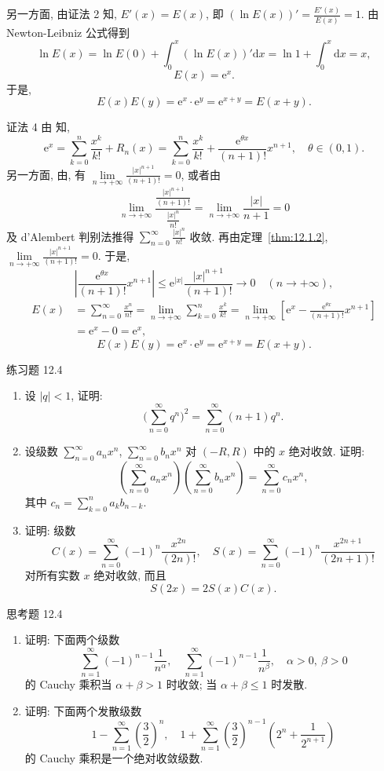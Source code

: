 另一方面, 由证法 2 知, $E'(x)=E(x)$, 即 $(\ln E(x))'=\frac{E'(x)}{E(x)}=1$. 由 Newton-Leibniz 公式得到
\[
  \ln E(x)=\ln E(0)+\int_{0}^{x}(\ln E(x))'\mathrm{d}x=\ln1+\int_{0}^{x}\mathrm{d}x=x,
\]
\[
  E(x)=\mathrm{e}^{x}.
\]
于是,
\[
  E(x)E(y)=\mathrm{e}^{x}\cdot\mathrm{e}^{y}=\mathrm{e}^{x+y}=E(x+y).
\]

证法 4 由 知,
\[
  \mathrm{e}^{x}=\sum_{k=0}^{n}\frac{x^{k}}{k!}+R_{n}(x)=\sum_{k=0}^{n}\frac{x^{k}}{k!}+\frac{\mathrm{e}^{\theta x}}{(n+1)!}x^{n+1},\quad\theta\in(0,1).
\]
另一方面, 由, 有 $\lim\limits_{n\to+\infty}\frac{|x|^{n+1}}{(n+1)!}=0$, 或者由
\[
  \lim_{n\to+\infty}\frac{\frac{|x|^{n+1}}{(n+1)!}}{\frac{|x|^{n}}{n!}}=\lim_{n\to+\infty}\frac{|x|}{n+1}=0
\]
及 d'Alembert 判别法推得 $\sum_{n=0}^{\infty}\frac{|x|^{n}}{n!}$ 收敛. 再由定理~\ref{thm:12.1.2}, $\lim\limits_{n\to+\infty}\frac{|x|^{n+1}}{(n+1)!}=0$. 于是,
\[
  \left|\frac{\mathrm{e}^{\theta x}}{(n+1)!}x^{n+1}\right|\leqslant\mathrm{e}^{|x|}\frac{|x|^{n+1}}{(n+1)!}\to0\quad(n\to+\infty),
\]
\[
  \begin{aligned}
    E(x)&=\sum_{n=0}^{\infty}\frac{x^{n}}{n!}=\lim_{n\to+\infty}\sum_{k=0}^{n}\frac{x^{k}}{k!}=\lim_{n\to+\infty}\left[\mathrm{e}^{x}-\frac{\mathrm{e}^{\theta x}}{(n+1)!}x^{n+1}\right]\\
    &=\mathrm{e}^{x}-0=\mathrm{e}^{x},
  \end{aligned}
\]
\[
  E(x)E(y)=\mathrm{e}^{x}\cdot\mathrm{e}^{y}=\mathrm{e}^{x+y}=E(x+y).
\]

\begin{exblock}{练习题 12.4}
\begin{enumerate}
  \item 设 $|q|<1$, 证明:
  \[
    \Big(\sum_{n=0}^{\infty}q^{n}\Big)^{2}=\sum_{n=0}^{\infty}(n+1)q^{n}.
\]
  \item 设级数 $\sum_{n=0}^{\infty}a_{n}x^{n}$, $\sum_{n=0}^{\infty}b_{n}x^{n}$ 对 $(-R,R)$ 中的 $x$ 绝对收敛. 证明:
  \[
    \left(\sum_{n=0}^{\infty}a_{n}x^{n}\right)\left(\sum_{n=0}^{\infty}b_{n}x^{n}\right)=\sum_{n=0}^{\infty}c_{n}x^{n},
\]
  其中 $c_{n}=\sum_{k=0}^{n}a_{k}b_{n-k}$.
  \item 证明: 级数
  \[
    C(x)=\sum_{n=0}^{\infty}(-1)^{n}\frac{x^{2n}}{(2n)!},\quad S(x)=\sum_{n=0}^{\infty}(-1)^{n}\frac{x^{2n+1}}{(2n+1)!}
\]
  对所有实数 $x$ 绝对收敛, 而且
  \[
    S(2x)=2S(x)C(x).
\]
\end{enumerate}
\end{exblock}

\begin{exblock}{思考题 12.4}
\begin{enumerate}
  \item 证明: 下面两个级数
  \[
    \sum_{n=1}^{\infty}(-1)^{n-1}\frac{1}{n^{\alpha}},\quad\sum_{n=1}^{\infty}(-1)^{n-1}\frac{1}{n^{\beta}},\quad\alpha>0,\ \beta>0
\]
  的 Cauchy 乘积当 $\alpha+\beta>1$ 时收敛; 当 $\alpha+\beta\leqslant1$ 时发散.
  \item 证明: 下面两个发散级数
  \[
    1-\sum_{n=1}^{\infty}\left(\frac{3}{2}\right)^{n},\quad1+\sum_{n=1}^{\infty}\left(\frac{3}{2}\right)^{n-1}\left(2^{n}+\frac{1}{2^{n+1}}\right)
\]
  的 Cauchy 乘积是一个绝对收敛级数.
\end{enumerate}
\end{exblock}
